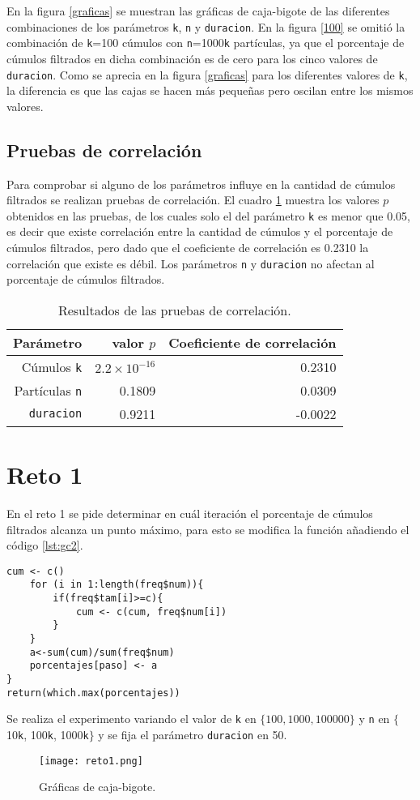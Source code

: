 \documentclass[12pt,letterpaper]{article}
\begin{document}
En la figura \ref{graficas} se muestran las gráficas de caja-bigote de las diferentes combinaciones de los parámetros \texttt{k}, \texttt{n} y \texttt{duracion}. En la figura \ref{100} se omitió la combinación de \texttt{k}=100 cúmulos con \texttt{n}=1000\texttt{k} partículas, ya que el porcentaje de cúmulos filtrados en dicha combinación es de cero para los cinco valores de \texttt{duracion}. Como se aprecia en la figura \ref{graficas} para los diferentes valores de \texttt{k}, la diferencia es que las cajas se hacen más pequeñas pero oscilan entre los mismos valores.

\subsection{Pruebas de correlación}
Para comprobar si alguno de los parámetros influye en la cantidad de cúmulos filtrados se realizan pruebas de correlación. El cuadro \ref{corr} muestra los valores $p$ obtenidos en las pruebas, de los cuales solo el del parámetro \texttt{k} es menor que 0.05, es decir que existe correlación entre la cantidad de cúmulos y el porcentaje de cúmulos filtrados, pero dado que el coeficiente de correlación es 0.2310 la correlación que existe es débil. Los parámetros \texttt{n} y \texttt{duracion} no afectan al porcentaje de cúmulos filtrados.
\begin{table}
\centering
\caption{Resultados de las pruebas de correlación.}
\label{corr}
\begin{tabular}{rrr}
  \hline
 Parámetro & valor $p$ & Coeficiente de correlación\\ 
  \hline
Cúmulos \texttt{k}& $2.2\times 10^{-16}$ &   0.2310 \\ 
Partículas \texttt{n}&  0.1809 &   0.0309 \\ 
\texttt{duracion}& 0.9211 & -0.0022 \\ 
\hline
\end{tabular}
\end{table}

\section{Reto 1}
En el reto 1 se pide determinar en cuál iteración el porcentaje de cúmulos filtrados alcanza un punto máximo, para esto se modifica la función añadiendo el código \ref{lst:gc2}.

\begin{lstlisting}[label=lst:gc2,caption=Iteración en la cuál el porcentaje de cúmulos filtrados es máximo., frame = single]
cum <- c()
	for (i in 1:length(freq$num)){
		if(freq$tam[i]>=c){
			cum <- c(cum, freq$num[i])
		}
	}
	a<-sum(cum)/sum(freq$num)
	porcentajes[paso] <- a
}
return(which.max(porcentajes))
\end{lstlisting} 
Se realiza el experimento variando el valor de \texttt{k} en $\{100, 1000, 100000\}$ y \texttt{n} en $\{$10\texttt{k}, 100\texttt{k}, 1000\texttt{k}$\}$ y se fija el parámetro \texttt{duracion} en 50.
\begin{figure}
 	\centering
 	\texttt{[image: reto1.png]}
 		 \caption{Gráficas de caja-bigote.}
 		\label{reto}
\end{figure}
 	
 

\end{document}
